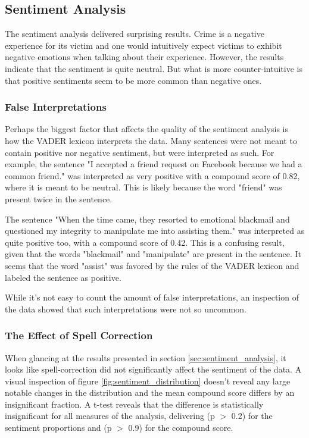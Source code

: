 \subsection{Sentiment Analysis}

The sentiment analysis delivered surprising results. Crime is a negative experience for its victim and one would intuitively expect victims to exhibit negative emotions when talking about their experience. However, the results indicate that the sentiment is quite neutral. But what is more counter-intuitive is that positive sentiments seem to be more common than negative ones.

\subsubsection*{False Interpretations}

Perhaps the biggest factor that affects the quality of the sentiment analysis is how the VADER lexicon interprets the data. Many sentences were not meant to contain positive nor negative sentiment, but were interpreted as such. For example, the sentence "I accepted a friend request on Facebook because we had a common friend." was interpreted as very positive with a compound score of 0.82, where it is meant to be neutral. This is likely because the word "friend" was present twice in the sentence.

The sentence "When the time came, they resorted to emotional blackmail and questioned my integrity to manipulate me into assisting them." was interpreted as quite positive too, with a compound score of 0.42. This is a confusing result, given that the words "blackmail" and "manipulate" are present in the sentence. It seems that the word "assist" was favored by the rules of the VADER lexicon and labeled the sentence as positive.

While it's not easy to count the amount of false interpretations, an inspection of the data showed that such interpretations were not so uncommon. 

\subsubsection*{The Effect of Spell Correction}

When glancing at the results presented in section \ref{sec:sentiment_analysis}, it looks like spell-correction did not significantly affect the sentiment of the data. A visual inspection of figure \ref{fig:sentiment_distribution} doesn't reveal any large notable changes in the distribution and the mean compound score differs by an insignificant fraction. A t-test reveals that the difference is statistically insignificant for all measures of the analysis, delivering (p $>$ 0.2) for the sentiment proportions and (p $>$ 0.9) for the compound score.

